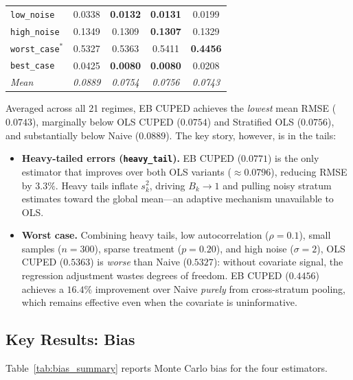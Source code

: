 \documentclass[12pt]{article}
\theoremstyle{plain}
\theoremstyle{definition}
\begin{document}
\begin{table}[htbp]
\begin{tabular}{l
  S[table-format=1.4]
  S[table-format=1.4]
  S[table-format=1.4]
  S[table-format=1.4]}
\midrule
\texttt{low\_noise}         & 0.0338 & \textbf{0.0132} & \textbf{0.0131} & 0.0199 \\
\texttt{high\_noise}        & 0.1349 & 0.1309 & \textbf{0.1307} & 0.1329 \\
\midrule
\texttt{worst\_case}$^*$    & 0.5327 & 0.5363 & 0.5411 & \textbf{0.4456} \\
\texttt{best\_case}         & 0.0425 & \textbf{0.0080} & \textbf{0.0080} & 0.0208 \\
\midrule
\textit{Mean}               & \textit{0.0889} & \textit{0.0754}
                            & \textit{0.0756}  & \textit{0.0743} \\
\bottomrule
\end{tabular}
\end{table}

Averaged across all 21 regimes, EB CUPED achieves the \emph{lowest} mean RMSE
($0.0743$), marginally below OLS CUPED ($0.0754$) and Stratified OLS
($0.0756$), and substantially below Naive ($0.0889$).
The key story, however, is in the tails:
\begin{itemize}
  \item \textbf{Heavy-tailed errors (\texttt{heavy\_tail}).}
        EB CUPED ($0.0771$) is the only estimator that improves over both OLS
        variants ($\approx 0.0796$), reducing RMSE by $3.3\%$.
        Heavy tails inflate $s_k^2$, driving $B_k \to 1$ and pulling noisy
        stratum estimates toward the global mean---an adaptive mechanism
        unavailable to OLS.

  \item \textbf{Worst case.}
        Combining heavy tails, low autocorrelation ($\rho = 0.1$), small
        samples ($n = 300$), sparse treatment ($p = 0.20$), and high noise
        ($\sigma = 2$), OLS CUPED ($0.5363$) is \emph{worse} than Naive
        ($0.5327$): without covariate signal, the regression adjustment
        wastes degrees of freedom.
        EB CUPED ($0.4456$) achieves a $16.4\%$ improvement over Naive
        \emph{purely} from cross-stratum pooling, which remains effective even
        when the covariate is uninformative.
\end{itemize}

\subsection{Key Results: Bias}

Table~\ref{tab:bias_summary} reports Monte Carlo bias for the four estimators.
\end{document}
